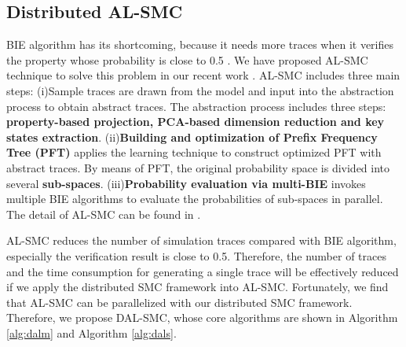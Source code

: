 \subsection{Distributed AL-SMC}
BIE algorithm has its shortcoming, because it needs more traces when it verifies the property whose probability is close to 0.5 \cite{zuliani2013bayesian}. We have proposed AL-SMC technique to solve this problem in our recent work \cite{jiangkaiqiang2016}. 
AL-SMC includes three main steps: (i)Sample traces are drawn from the model and input into the abstraction process to obtain abstract traces. The abstraction process includes three steps: \textbf{property-based projection, PCA-based dimension reduction \cite{dunteman1989principal} and key states extraction}. (ii)\textbf{Building and optimization of Prefix Frequency Tree (PFT)} applies the learning technique \cite{carrasco1994learning} to construct optimized PFT with abstract traces. By means of PFT, the original probability space is divided into several \textbf{sub-spaces}. (iii)\textbf{Probability evaluation via multi-BIE} invokes multiple BIE algorithms to evaluate the probabilities of sub-spaces in parallel. The detail of AL-SMC can be found in \cite{jiangkaiqiang2016}.

AL-SMC reduces the number of simulation traces compared with BIE algorithm, especially the verification result is close to 0.5. Therefore, the number of traces and the time consumption for generating a single trace will be effectively reduced if we apply the distributed SMC framework into AL-SMC. Fortunately, we find that AL-SMC can be  parallelized with our distributed SMC framework. Therefore, we propose DAL-SMC, whose core algorithms are shown in Algorithm \ref{alg:dalm} and Algorithm \ref{alg:dals}.

